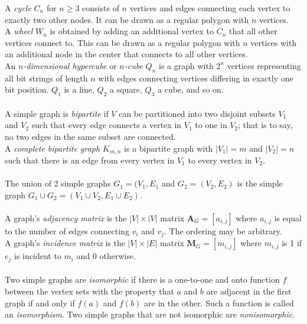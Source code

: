\documentclass[12pt, A4, twocolumn]{article}
\begin{document}
		A \textit{cycle} \(C_n\) for \(n \ge 3\) consists of \(n\) vertices and edges connecting each vertex to exactly two other nodes. It can be drawn as a regular polygon with \(n\) vertices. \\
		A \textit{wheel} \(W_n\) is obtained by adding an additional vertex to \(C_n\) that all other vertices connect to. This can be drawn as a regular polygon with \(n\) vertices with an additional node in the center that connects to all other vertices. \\
		An \textit{\(n\)-dimensional hypercube} or \textit{\(n\)-cube} \(Q_n\) is a graph with \(2^n\) vertices representing all bit strings of length \(n\) with edges connecting vertices differing in exactly one bit position. \(Q_1\) is a line, \(Q_2\) a square, \(Q_3\) a cube, and so on. \\\\
		A simple graph is \textit{bipartite} if \(V\) can be partitioned into two disjoint subsets \(V_1\) and \(V_2\) such that every edge connects a vertex in \(V_1\) to one in \(V_2\); that is to say, no two edges in the same subset are connected. \\
		A \textit{complete bipartite graph} \(K_{m, n}\) is a bipartite graph with \(|V_1| = m\) and \(|V_2| = n\) such that there is an edge from every vertex in \(V_1\) to every vertex in \(V_2\). \\\\
		The union of 2 simple graphs \(G_1 = (V_1, E_1\) and \(G_2 = (V_2, E_2)\) is the simple graph \(G_1 \cup G_2 = (V_1 \cup V_2, E_1 \cup E_2)\). \\\\
		A graph's \textit{adjacency matrix} is the \(|V| \times |V|\) matrix \(\textbf{A}_G = [a_{i, j}]\) where \(a_{i, j}\) is equal to the number of edges connecting \(v_i\) and \(v_j\). The ordering may be arbitrary. \\
		A graph's \textit{incidence matrix} is the \(|V| \times |E|\) matrix \(\textbf{M}_G = [m_{i, j}]\) where \(m_{i, j}\) is 1 if \(e_j\) is incident to \(m_i\) and 0 otherwise. \\\\
		Two simple graphs are \textit{isomorphic} if there is a one-to-one and onto function \(f\) between the vertex sets with the property that \(a\) and \(b\) are adjacent in the first graph if and only if \(f(a)\) and \(f(b)\) are in the other. Such a function is called an \textit{isomorphism}. Two simple graphs that are not isomorphic are \textit{nonisomorphic}. \\\\
\end{document}
